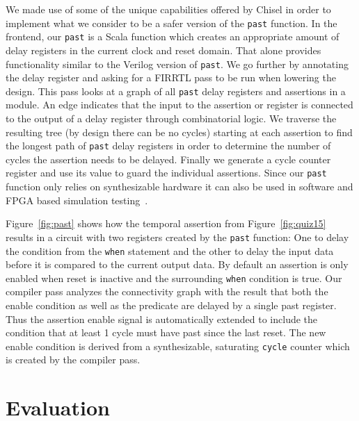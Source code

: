 \documentclass[conference]{IEEEtran}
\newcommand{\code}[1]{{\small{\texttt{#1}}}}
\begin{document}
We made use of some of the unique capabilities offered by Chisel in order to implement what we consider to be a safer version of the
\code{past} function.
In the frontend, our \code{past} is a Scala function which creates an appropriate amount of delay registers in the current
clock and reset domain. That alone provides functionality similar to the Verilog version of \code{past}.
We go further by annotating the delay register and asking for a FIRRTL pass to be run when lowering the design.
This pass looks at a graph of all \code{past} delay registers and assertions in a module.
An edge indicates that the input to the assertion or register is connected to the output of a delay register through combinatorial logic.
We traverse the resulting tree (by design there can be no cycles) starting at each assertion
to find the longest path of \code{past} delay registers in order to determine the number of cycles the assertion needs to be delayed.
Finally we generate a cycle counter register and use its value to guard the individual assertions.
Since our \code{past} function only relies on synthesizable hardware it can also be used in software and FPGA based
simulation testing~\cite{karandikar2018firesim}.

Figure~\ref{fig:past} shows how the temporal assertion from Figure~\ref{fig:quiz15} results in a circuit with two registers created by the \code{past} function:
One to delay the condition from the \code{when} statement and the other to delay the input data before it is compared to the current output data.
By default an assertion is only enabled when reset is inactive and the surrounding \code{when} condition is true.
Our compiler pass analyzes the connectivity graph with the result that both the enable condition as well as the predicate are delayed by a single past register.
Thus the assertion enable signal is automatically extended to include the condition that at least 1 cycle must have past since the last reset.
The new enable condition is derived from a synthesizable, saturating \code{cycle} counter which is created by the compiler pass.


  

\section{Evaluation}
\label{sec:eval}
\end{document}
